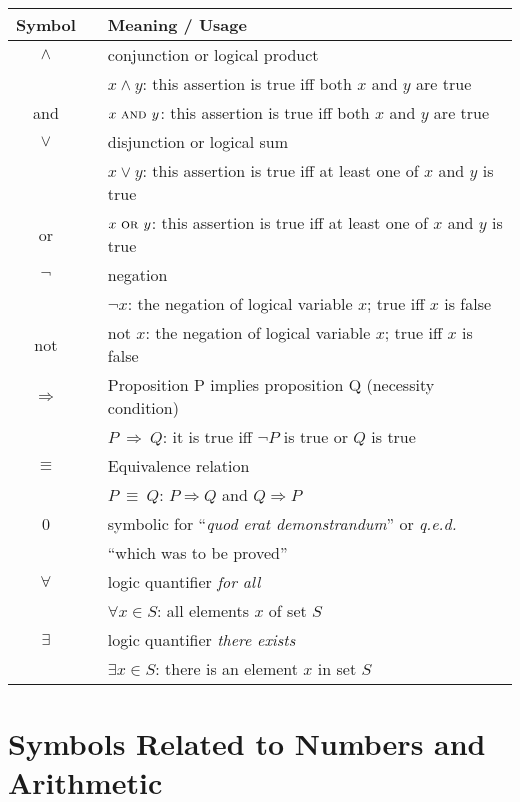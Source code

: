 \begin{tabular}{c|cl}
{\bf Symbol} & & {\bf Meaning} / {\bf Usage} \\ \hline
\hline
$\wedge$
  & & conjunction or logical product \\
  & & $x \wedge y$: this assertion is true iff both $x$ and $y$ are true \\
{\sc and}
  & & $x \ \mbox{\sc and } y$: this assertion is true iff both $x$ and $y$ are true \\ \hline
$\vee$
  & & disjunction or logical sum \\
  & & $x \vee y$:  this assertion is true iff at least one of $x$ and $y$ is true \\
{\sc or}
  & & $x \ \mbox{\sc or } y$:  this assertion is true iff at least one of $x$ and $y$ is true  \\ \hline
$\neg$
  & & negation \\
  & & $\neg x$: the negation of logical variable $x$; true iff $x$ is false \\ 
{\sc not}
    & & {\sc not}  $x$: the negation of logical variable $x$; true iff $x$ is false \\ \hline
$ \Rightarrow $
  & & Proposition P implies proposition Q (necessity condition) \\
  & & $P \ \Rightarrow \ Q$: it is true iff $\neg P$ is true or $ Q$ is true  \\ \hline
    $ \equiv $
  & & Equivalence relation \\
  & & $P \ \equiv \ Q$: $P \Rightarrow Q$ and $ Q \Rightarrow P$  \\ \hline
\qed
  & & symbolic for ``{\em quod erat demonstrandum}'' or {\em q.e.d.} \\
  & & ``which was to be proved'' \\
\hline 
$\forall$
  & & logic quantifier \textit{for all} \\
  & & $\forall x \in S$:  all elements $x$ of set $S$\\ \hline
  $ \exists $
  & & logic quantifier \textit{there exists} \\
  & & $\exists x \in S$: there is an element $x$ in set $S$  \\ \hline
\end{tabular}


\section*{Symbols Related to Numbers and Arithmetic}

